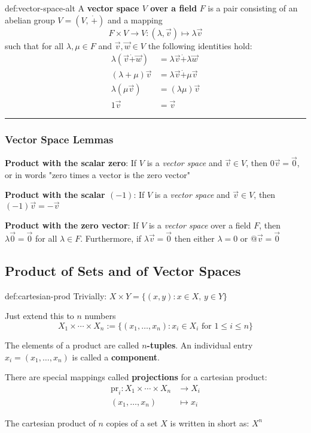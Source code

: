 \documentclass{article}
\begin{document}
\begin{dfn}{def:vector-space-alt}{}
    A \textbf{vector space $V$ over a field} $F$ is a pair consisting of an abelian group $V = (V,\, \dot{+})$ and a mapping
    \[F \times V \to V : (\lambda, \vec{v})\mapsto \lambda \vec{v}\]
    such that for all $\lambda, \mu \in F$ and $\vec{v}, \vec{w}\in V$ the following identities hold:
    \begin{align*}
        \lambda(\vec{v} \dot{+} \vec{w}) &= \lambda\vec{v} \dot{+} \lambda \vec{w}\\
        (\lambda + \mu)\vec{v} &= \lambda \vec{v} \dot{+} \mu \vec{v}\\
        \lambda (\mu \vec{v}) &= (\lambda \mu) \vec{v}\\
        1\vec{v} &= \vec{v}
    \end{align*}
\end{dfn}

\noindent\rule{\textwidth}{0.2pt}

\subsubsection{Vector Space Lemmas}

\textbf{Product with the scalar zero}: If $V$ is a \textit{vector space} and $\vec{v}\in V$, then $0\vec{v} = \vec{0}$, or in words "zero times a vector is the zero vector"

\textbf{Product with the scalar $(-1)$}: If $V$ is a \textit{vector space} and $\vec{v}\in V$, then $(-1)\vec{v} = - \vec{v}$

\textbf{Product with the zero vector}: If $V$ is a \textit{vector space} over a field $F$, then $\lambda \vec{0} = \vec{0}$ for all $\lambda\in F$. Furthermore, if $\lambda \vec{v} = \vec{0}$ then either $\lambda = 0$ or $@\vec{v} = \vec{0}$

\newpage
\subsection{Product of Sets and of Vector Spaces}

\begin{dfn}{def:cartesian-prod}{}
    Trivially: $X \times Y = \{(x,y) : x\in X,\,y\in Y\}$

    Just extend this to $n$ numbers
    \[X_{1} \times \cdots \times X_{n} := \{(x_{1}, \dots, x_{n}) : x_{i}\in X_{i} \text{ for } 1 \le i \le n\}\]

    The elements of a product are called \textbf{$n$-tuples}. An individual entry $x_{i} = (x_{1}, \dots ,x_{n})$ is called a \textbf{component}.

    There are special mappings called \textbf{projections} for a cartesian product:
    \begin{align*}
        \text{pr}_{i} : X_{1} \times \cdots \times X_{n} &\to X_{i}\\
        (x_{1},\dots,x_{n}) &\mapsto x_{i}
    \end{align*}

    The cartesian product of $n$ copies of a set $X$ is written in short as: $X^{n}$
\end{dfn}
\end{document}
